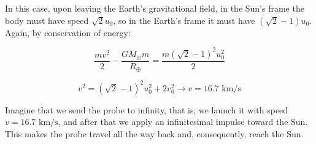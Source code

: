 \documentclass[11pt]{article}
\begin{document}
\begin{pproblem}
\begin{pssolution*}{}{}
\begin{alternativas}
            \item In this case, upon leaving the Earth's gravitational field, in the Sun's frame the body must have speed \(\sqrt{2}u_0\), so in the Earth's frame it must have \((\sqrt{2}-1)u_0\). Again, by conservation of energy:
            
            \[\frac{mv^2}{2}-\frac{GM_\oplus m}{R_\oplus} = \frac{m(\sqrt{2}-1)^2u_0^2}{2}\]

            \[v^2 = (\sqrt{2}-1)^2u_0^2+2v_0^2 \rightarrow \boxed{v = 16.7 \text{ km/s}}\]

            \item Imagine that we send the probe to infinity, that is, we launch it with speed \(v=16.7\text{ km/s}\), and after that we apply an infinitesimal impulse toward the Sun. This makes the probe travel all the way back and, consequently, reach the Sun.
        \end{alternativas}
    \end{pssolution*}
\end{pproblem}
\end{document}
